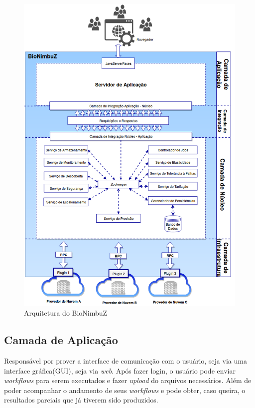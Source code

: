 \begin{figure}[htbp]
	\centerline{\includegraphics[scale=0.45]{img/ArquiteturaBioNimbuZ.png}}
	\caption{Arquitetura do BioNimbuZ}
	\label{Arquitetura}
\end{figure}



\subsection{Camada de Aplicação} Responsável por prover a interface de comunicação com o usuário, seja via uma interface gráfica(GUI), seja via \textit{web}. Após fazer login, o usuário pode enviar \textit{workflows} para serem executados e fazer \textit{upload} do arquivos necessários. Além de poder acompanhar o andamento de seus \textit{workflows} e pode obter, caso queira, o resultados parciais que já tiverem sido produzidos.

